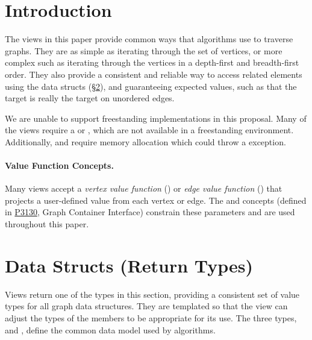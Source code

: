
\clearpage

\section{Introduction}

The views in this paper provide common ways that algorithms use to traverse graphs. They are as simple as iterating 
through the set of vertices, or more complex such as iterating through the vertices in a depth-first and breadth-first order. They also 
provide a consistent and reliable way to access related elements using the data structs (\S\ref{sec:data-structs}), and guaranteeing expected 
values, such as that the target is really the target on unordered edges.

We are unable to support freestanding implementations in this proposal. Many of the
views require a  or , which are not available in a freestanding environment. 
Additionally,  and  require memory allocation which could throw a  
exception. 

\paragraph{Value Function Concepts.}
Many views accept a \emph{vertex value function} () or \emph{edge value function} () that projects 
a user-defined value from each vertex or edge. The  and  concepts 
(defined in \href{https://www.wg21.link/P3130}{P3130}, Graph Container Interface) constrain these parameters and are used 
throughout this paper.

\section{Data Structs (Return Types)}\label{sec:data-structs}
Views return one of the types in this section, providing a consistent set of value types for all graph data structures. 
They are templated so that the view can adjust the types of the members to be appropriate for its use. The three types, 
 and , define the common data model used by algorithms.

